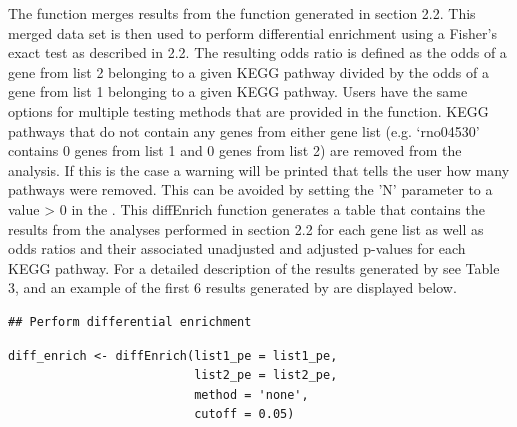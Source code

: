 \documentclass[article]{jss}\usepackage[]{graphicx}\usepackage[]{color}
\makeatletter
\newenvironment{kframe}{%
 \def\at@end@of@kframe{}%
 \ifinner\ifhmode%
  \def\at@end@of@kframe{\end{minipage}}%
  \begin{minipage}{\columnwidth}%
 \fi\fi%
 \def\FrameCommand##1{\hskip\@totalleftmargin \hskip-\fboxsep
 \colorbox{shadecolor}{##1}\hskip-\fboxsep
     \hskip-\linewidth \hskip-\@totalleftmargin \hskip\columnwidth}%
 \MakeFramed {\advance\hsize-\width
   \@totalleftmargin\z@ \linewidth\hsize
   \@setminipage}}%
 {\par\unskip\endMakeFramed%
 \at@end@of@kframe}
\newenvironment{knitrout}{}{} %
\makeatother
\begin{document}
The  function merges results from the  function
generated in section 2.2. This merged data set is then used to perform differential
enrichment using a Fisher’s exact test as described in 2.2. The resulting odds
ratio is defined as the odds of a gene from list 2 belonging to a given KEGG
pathway divided by the odds of a gene from list 1 belonging to a given KEGG
pathway. Users have the same options for multiple testing methods that are
provided in the  function. KEGG pathways that do not contain
any genes from either gene list (e.g. ‘rno04530’ contains 0 genes from list 1
and 0 genes from list 2) are removed from the analysis. If this is the case a
warning will be printed that tells the user how many pathways were removed.
This can be avoided by setting the 'N' parameter to a value > 0 in the
. This diffEnrich function generates a table that
contains the results from the analyses performed in section 2.2 for each gene
list as well as odds ratios and their associated unadjusted and adjusted
p-values for each KEGG pathway. For a detailed description of the results
generated by  see Table 3, and an example of the first 6
results generated by  are displayed below.

\begin{knitrout}
\color{fgcolor}\begin{kframe}
\begin{lstlisting}[basicstyle=\ttfamily,breaklines=true]
## Perform differential enrichment\end{lstlisting}
\begin{lstlisting}[basicstyle=\ttfamily,breaklines=true]
diff_enrich <- diffEnrich(list1_pe = list1_pe,
                          list2_pe = list2_pe,
                          method = 'none',
                          cutoff = 0.05)\end{lstlisting}
\end{kframe}
\end{knitrout}
\end{document}
